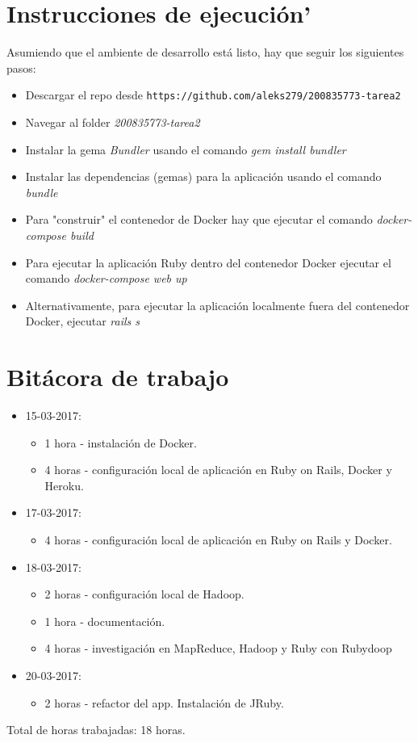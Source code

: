 \documentclass{article}
\begin{document}
\section{Instrucciones de ejecuci\'on'}
Asumiendo que el ambiente de desarrollo est\'a listo, hay que seguir los siguientes pasos:
\begin{itemize}
  \item Descargar el repo desde \texttt{https://github.com/aleks279/200835773-tarea2}
  \item Navegar al folder \emph{200835773-tarea2}
  \item Instalar la gema \emph{Bundler} usando el comando \emph{gem install bundler}
  \item Instalar las dependencias (gemas) para la aplicaci\'on usando el comando \emph{bundle}
  \item Para "construir" el contenedor de Docker hay que ejecutar el comando \emph{docker-compose build}
  \item Para ejecutar la aplicaci\'on Ruby dentro del contenedor Docker ejecutar el comando \emph{docker-compose web up}
  \item Alternativamente, para ejecutar la aplicaci\'on localmente fuera del contenedor Docker, ejecutar \emph{rails s}
\end{itemize}

\section{Bit\'acora de trabajo}
\begin{itemize}
  \item 15-03-2017:
  \begin{itemize}
    \item 1 hora - instalaci\'on de Docker.
    \item 4 horas - configuraci\'on local de aplicaci\'on en Ruby on Rails, Docker y Heroku.
  \end{itemize}
  \item 17-03-2017:
  \begin{itemize}
    \item 4 horas - configuraci\'on local de aplicaci\'on en Ruby on Rails y Docker.
  \end{itemize}
  \item 18-03-2017:
  \begin{itemize}
    \item 2 horas - configuraci\'on local de Hadoop.
    \item 1 hora - documentaci\'on.
    \item 4 horas - investigaci\'on en MapReduce, Hadoop y Ruby con Rubydoop
  \end{itemize}
  \item 20-03-2017:
  \begin{itemize}
    \item 2 horas - refactor del app. Instalaci\'on de JRuby.
  \end{itemize}
\end{itemize}
Total de horas trabajadas: 18 horas.
\end{document}
